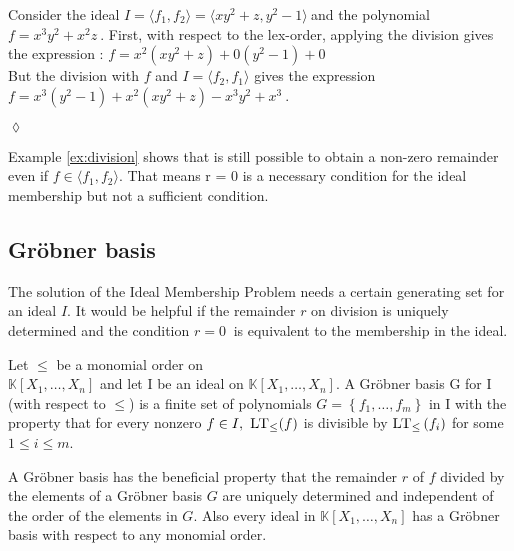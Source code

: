 \begin{env_example}\normalfont
\label{ex:division}
Consider the ideal $I = \langle f_{1},f_{2} \rangle = \langle xy^{2}+z,y^{2}-1 \rangle~$and the polynomial $f = x^{3}y^{2}+x^{2}z~$.
First, with respect to the lex-order, applying the division gives the expression : $f = x^{2}(xy^{2}+z) + 0(y^{2}-1) + 0$ \\
But the division with $f$ and $I = \langle f_{2},f_{1} \rangle$ gives the expression \\ $f = x^{3}(y^{2}-1) + x^{2}(xy^{2}+z) -x^{3}y^{2}+x^{3}~$.
\begin{flushright}
$\lozenge$
\end{flushright}
\end{env_example}



Example \ref{ex:division} shows that is still possible to obtain a non-zero remainder even if $f \in \langle f_{1},f_{2} \rangle $. That means r = 0 is a  necessary condition for the ideal membership but not a sufficient condition.
\subsection{Gröbner basis}
\label{subsec:Groebner}

The solution of the Ideal Membership Problem needs a certain generating set for an ideal $I$. It would be helpful if the remainder $r$ on division is uniquely determined and the condition $ r = 0~$ is equivalent to the membership in the ideal.



\begin{env_definition}
\cite{KHZ}
Let $\leq$ be a monomial order on \\ $\mathbb{K}\left[X_{1}, \dots, X_{n}\right]$ and let I be an ideal on $ \mathbb{K}\left[X_{1}, \dots, X_{n}\right]  $. A Gröbner basis G for I (with respect to $\leq$) is a finite set of polynomials $ G = \left\lbrace f_{1}, \ldots , f_{m} \right\rbrace $ in I with the property that for every nonzero $ f \in I ,~\textsc{LT}_{\leq}(f) $ is divisible by $\textsc{LT}_{\leq}\left( f_{i}\right) $ for some $ 1 \leq i \leq m $.

\end{env_definition}

A Gröbner basis has the beneficial property that the remainder $r$ of $f$ divided by the elements of a Gröbner basis $G$ are uniquely determined and independent of the order of the elements in $G$.
Also every ideal in $\mathbb{K}\left[X_{1}, \dots, X_{n}\right]$ has a Gröbner basis with respect to any monomial order\cite{KHZ}.\\ 


